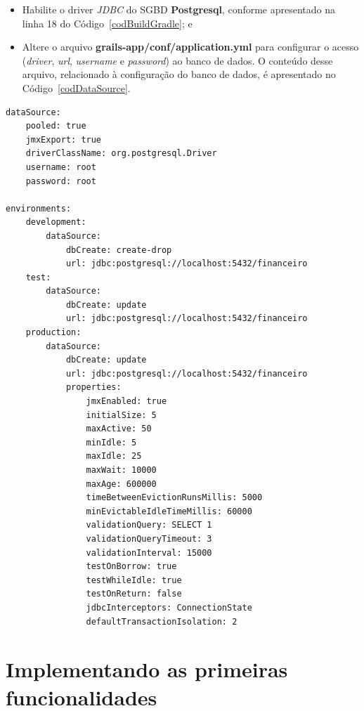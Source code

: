 \begin{itemize}

\item  Habilite  o  driver  {\it   JDBC}  do  SGBD  {\bf  Postgresql},  conforme
  apresentado na linha 18 do Código~\ref{codBuildGradle}; e 

\vspace{0.3cm}

\item Altere o arquivo {\bf grails-app/conf/application.yml} para configurar o
  acesso ({\it driver}, {\it url}, {\it  username} e {\it password}) ao banco de
  dados.   O conteúdo  desse arquivo,  relacionado  à configuração  do banco  de
  dados, é apresentado no Código~\ref{codDataSource}.  

\end{itemize}

\vspace{0.2cm}

\begin{lstlisting}[caption={\bf application.yml  (configuração banco de dados)},
    frame = trBL, float=htbp, label=codDataSource, basicstyle = \footnotesize] 
dataSource:
    pooled: true
    jmxExport: true
    driverClassName: org.postgresql.Driver
    username: root
    password: root

environments:
    development:
        dataSource:
            dbCreate: create-drop
            url: jdbc:postgresql://localhost:5432/financeiro
    test:
        dataSource:
            dbCreate: update
            url: jdbc:postgresql://localhost:5432/financeiro
    production:
        dataSource:
            dbCreate: update
            url: jdbc:postgresql://localhost:5432/financeiro
            properties:
                jmxEnabled: true
                initialSize: 5
                maxActive: 50
                minIdle: 5
                maxIdle: 25
                maxWait: 10000
                maxAge: 600000
                timeBetweenEvictionRunsMillis: 5000
                minEvictableIdleTimeMillis: 60000
                validationQuery: SELECT 1
                validationQueryTimeout: 3
                validationInterval: 15000
                testOnBorrow: true
                testWhileIdle: true
                testOnReturn: false
                jdbcInterceptors: ConnectionState
                defaultTransactionIsolation: 2
\end{lstlisting}
\newpage

\section{Implementando as primeiras funcionalidades}\label{CRUD}

